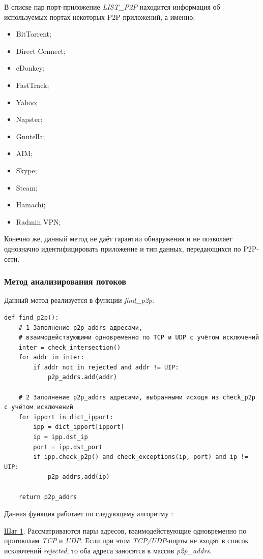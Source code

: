 \documentclass[bachelor, och, coursework]{SCWorks}
\begin{document}
В списке пар порт-приложение \textit{LIST_P2P} находится информация об используемых портах некоторых P2P-приложений, а именно:

\begin{itemize}
    \item BitTorrent;
    \item Direct Connect;
    \item eDonkey;
    \item FastTrack;
    \item Yahoo;
    \item Napster;
    \item Gnutella;
    \item AIM;
    \item Skype;
    \item Steam;
    \item Hamachi;
    \item Radmin VPN;
\end{itemize}

Конечно же, данный метод не даёт гарантии обнаружения и не позволяет однозначно идентифицировать приложение и тип данных, передающихся по P2P-сети.

\subsubsection{Метод анализирования потоков}
Данный метод реализуется в функции \textit{find_p2p}:

\begin{verbatim}
def find_p2p():
    # 1 Заполнение p2p_addrs адресами, 
    # взаимодействующими одновременно по TCP и UDP с учётом исключений
    inter = check_intersection()
    for addr in inter:
        if addr not in rejected and addr != UIP:
            p2p_addrs.add(addr)

    # 2 Заполнение p2p_addrs адресами, выбранными исходя из check_p2p с учётом исключений
    for ipport in dict_ipport:
        ipp = dict_ipport[ipport]
        ip = ipp.dst_ip
        port = ipp.dst_port
        if ipp.check_p2p() and check_exceptions(ip, port) and ip != UIP:
            p2p_addrs.add(ip)

    return p2p_addrs
\end{verbatim}

Данная функция работает по следующему алгоритму \cite{algorithm}:

\underline{Шаг 1}. Рассматриваются пары адресов, взаимодействующие одновременно по протоколам \textit{TCP} и \textit{UDP}. 
Если при этом \textit{TCP/UDP}-порты не входят в список исключений \textit{rejected}, то оба адреса заносятся в массив \textit{p2p_addrs}.
\end{document}
